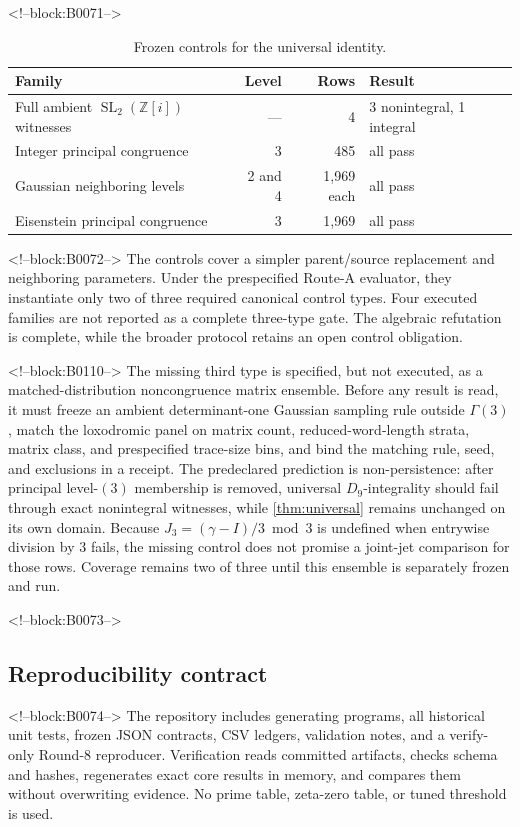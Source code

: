 \documentclass[11pt,a4paper]{article}
\theoremstyle{definition}
\theoremstyle{remark}
\newcommand{\SL}{\operatorname{SL}}
\newcommand{\Gauss}{\mathbb{Z}[i]}
\begin{document}
<!--block:B0071-->
\begin{table}[t]
\centering
\caption{Frozen controls for the universal identity.}
\label{tab:controls}
\begin{tabular}{lrrl}
\toprule
Family & Level & Rows & Result \\
\midrule
Full ambient \(\SL_2(\Gauss)\) witnesses & --- & 4 & 3 nonintegral, 1 integral \\
Integer principal congruence & 3 & 485 & all pass \\
Gaussian neighboring levels & 2 and 4 & 1,969 each & all pass \\
Eisenstein principal congruence & 3 & 1,969 & all pass \\
\bottomrule
\end{tabular}
\end{table}

<!--block:B0072-->
The controls cover a simpler parent/source replacement and neighboring parameters. Under the prespecified Route-A evaluator, they instantiate only two of three required canonical control types. Four executed families are not reported as a complete three-type gate. The algebraic refutation is complete, while the broader protocol retains an open control obligation.

<!--block:B0110-->
The missing third type is specified, but not executed, as a matched-distribution noncongruence matrix ensemble. Before any result is read, it must freeze an ambient determinant-one Gaussian sampling rule outside \(\Gamma(3)\), match the loxodromic panel on matrix count, reduced-word-length strata, matrix class, and prespecified trace-size bins, and bind the matching rule, seed, and exclusions in a receipt. The predeclared prediction is non-persistence: after principal level-\((3)\) membership is removed, universal \(D_9\)-integrality should fail through exact nonintegral witnesses, while \cref{thm:universal} remains unchanged on its own domain. Because \(J_3=(\gamma-I)/3\bmod3\) is undefined when entrywise division by \(3\) fails, the missing control does not promise a joint-jet comparison for those rows. Coverage remains two of three until this ensemble is separately frozen and run.

<!--block:B0073-->
\subsection{Reproducibility contract}

<!--block:B0074-->
The repository includes generating programs, all historical unit tests, frozen JSON contracts, CSV ledgers, validation notes, and a verify-only Round-8 reproducer. Verification reads committed artifacts, checks schema and hashes, regenerates exact core results in memory, and compares them without overwriting evidence. No prime table, zeta-zero table, or tuned threshold is used.
\end{document}

